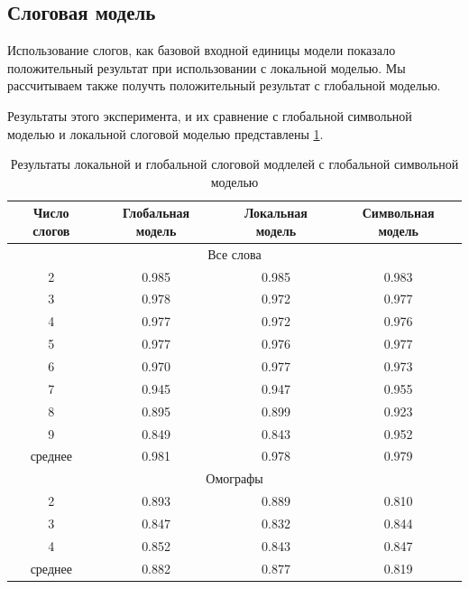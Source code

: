 \documentclass[14pt, a4paper, russian]{extreport}
\begin{document}
\subsection{Слоговая модель}
Использование слогов, как базовой входной единицы модели показало положительный результат при использовании с локальной моделью. Мы рассчитываем также получть положительный результат с глобальной моделью.

Результаты этого эксперимента, и их сравнение с  глобальной символьной моделью и локальной слоговой моделью представлены \cref{table:global_syl}.

\begin{table}[H]
	\caption{Результаты локальной и глобальной слоговой модлелей с глобальной символьной моделью}
	
	\begin{small}
		\begin{center}
			\begin{tabular}{|c | c | c|c|}
				\hline
				Число слогов & Глобальная модель & Локальная модель & Символьная модель \\ \hline
				\multicolumn{4}{|c|}{Все слова}                                       \\ \hline
				2       & 0.985  &      0.985      & 0.983             \\ \hline
				3       &   0.978 &      0.972      & 0.977             \\ \hline
				4       &   0.977 &      0.972      & 0.976             \\ \hline
				5       &  0.977 &      0.976      & 0.977             \\ \hline
				6       &  0.970 &      0.977      & 0.973             \\ \hline
				7       &  0.945 &      0.947      & 0.955             \\ \hline
				8       &  0.895 &      0.899      & 0.923             \\ \hline
				9       & 0.849 &      0.843      & 0.952             \\ \hline
				среднее    & 0.981 &      0.978      & 0.979             \\ \hline
				\multicolumn{4}{|c|}{Омографы}                                        \\ \hline
				
				2       & 0.893&      0.889      & 0.810             \\ \hline
				3       & 0.847&      0.832      & 0.844             \\ \hline
				4       & 0.852&      0.843      & 0.847             \\ \hline
				среднее    & 0.882 &      0.877      & 0.819             \\ \hline
			\end{tabular}
		\end{center}
	\end{small}
	\label{table:global_syl}
\end{table}
\end{document}
